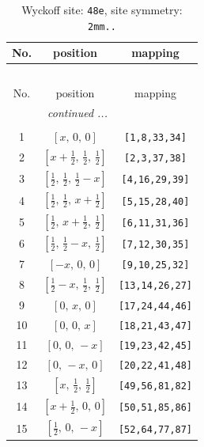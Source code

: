 \documentclass[fleqn,8pt]{jsarticle}
\begin{document}
\begin{longtable}{ccc}
\caption{Wyckoff site: {\tt 48e}, site symmetry: {\tt 2mm..}}
 \\
 \hline \hline
No. & position & mapping \\ \hline \endfirsthead

\multicolumn{2}{l}{\tablename\ \thetable{}} \\
 \hline \hline
No. & position & mapping \\ \hline \endhead

 \hline \hline
\multicolumn{2}{r}{\footnotesize\it continued ...} \\ \endfoot

 \hline \hline
\multicolumn{2}{r}{} \\ \endlastfoot

1 & $\left[ x,\, 0,\, 0 \right]$ & {\tt [1,8,33,34]} \\ \hline
2 & $\left[ x + \frac{1}{2},\, \frac{1}{2},\, \frac{1}{2} \right]$ & {\tt [2,3,37,38]} \\ \hline
3 & $\left[ \frac{1}{2},\, \frac{1}{2},\, \frac{1}{2} - x \right]$ & {\tt [4,16,29,39]} \\ \hline
4 & $\left[ \frac{1}{2},\, \frac{1}{2},\, x + \frac{1}{2} \right]$ & {\tt [5,15,28,40]} \\ \hline
5 & $\left[ \frac{1}{2},\, x + \frac{1}{2},\, \frac{1}{2} \right]$ & {\tt [6,11,31,36]} \\ \hline
6 & $\left[ \frac{1}{2},\, \frac{1}{2} - x,\, \frac{1}{2} \right]$ & {\tt [7,12,30,35]} \\ \hline
7 & $\left[ - x,\, 0,\, 0 \right]$ & {\tt [9,10,25,32]} \\ \hline
8 & $\left[ \frac{1}{2} - x,\, \frac{1}{2},\, \frac{1}{2} \right]$ & {\tt [13,14,26,27]} \\ \hline
9 & $\left[ 0,\, x,\, 0 \right]$ & {\tt [17,24,44,46]} \\ \hline
10 & $\left[ 0,\, 0,\, x \right]$ & {\tt [18,21,43,47]} \\ \hline
11 & $\left[ 0,\, 0,\, - x \right]$ & {\tt [19,23,42,45]} \\ \hline
12 & $\left[ 0,\, - x,\, 0 \right]$ & {\tt [20,22,41,48]} \\ \hline
13 & $\left[ x,\, \frac{1}{2},\, \frac{1}{2} \right]$ & {\tt [49,56,81,82]} \\ \hline
14 & $\left[ x + \frac{1}{2},\, 0,\, 0 \right]$ & {\tt [50,51,85,86]} \\ \hline
15 & $\left[ \frac{1}{2},\, 0,\, - x \right]$ & {\tt [52,64,77,87]} \\ \hline

\end{longtable}
\end{document}

